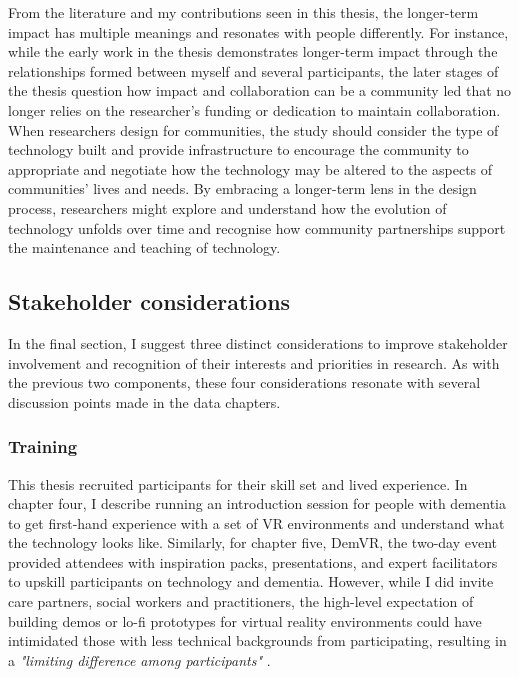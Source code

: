 From the literature and my contributions seen in this thesis, the longer-term impact has multiple meanings and resonates with people differently. For instance, while the early work in the thesis demonstrates longer-term impact through the relationships formed between myself and several participants, the later stages of the thesis question how impact and collaboration can be a community led that no longer relies on the researcher's funding or dedication to maintain collaboration. When researchers design for communities, the study should consider the type of technology built and provide infrastructure to encourage the community to appropriate and negotiate how the technology may be altered to the aspects of communities’ lives and needs. By embracing a longer-term lens in the design process, researchers might explore and understand how the evolution of technology unfolds over time and recognise how community partnerships support the maintenance and teaching of technology.

\subsection{Stakeholder considerations}
\label{StakeholderConsideration}
In the final section, I suggest three distinct considerations to improve stakeholder involvement and recognition of their interests and priorities in research. As with the previous two components, these four considerations resonate with several discussion points made in the data chapters.

\subsubsection{Training}
\label{Training}
This thesis recruited participants for their skill set and lived experience. In chapter four, I describe running an introduction session for people with dementia to get first-hand experience with a set of VR environments and understand what the technology looks like. Similarly, for chapter five, DemVR, the two-day event provided attendees with inspiration packs, presentations, and expert facilitators to upskill participants on technology and dementia. However, while I did invite care partners, social workers and practitioners, the high-level expectation of building demos or lo-fi prototypes for virtual reality environments could have intimidated those with less technical backgrounds from participating, resulting in a \textit{"limiting difference among participants"} \citep{irani_hackathons_2015}. 

